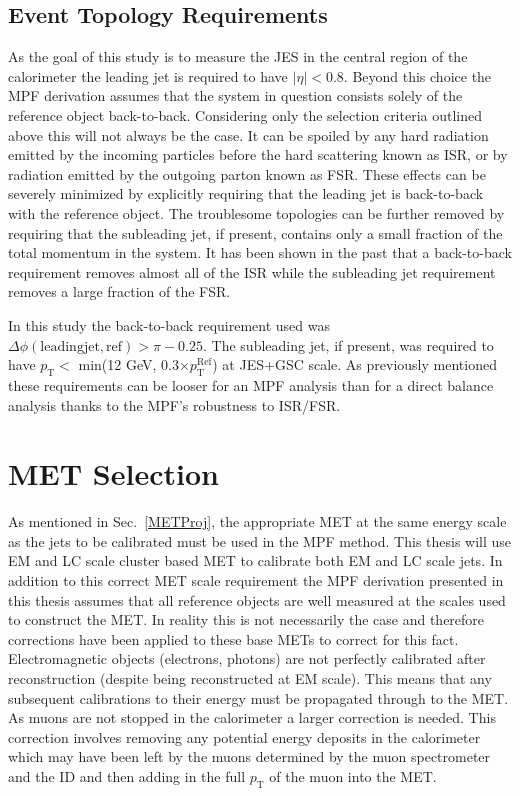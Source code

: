 
\subsection{Event Topology Requirements}
\label{Sec:EventTopology}
As the goal of this study is to measure the \gls{JES} in the central region of the calorimeter the leading jet is required to have $\mid\eta\mid<$0.8.  
Beyond this choice the MPF derivation assumes that the system in question consists solely of the reference object back-to-back.  
Considering only the selection criteria outlined above this will not always be the case.  
It can be spoiled by any hard radiation emitted by the incoming particles before the hard scattering known as \gls{ISR}, or by radiation emitted by the outgoing parton known as \gls{FSR}.  
These effects can be severely minimized by explicitly requiring that the leading jet is back-to-back with the reference object.  
The troublesome topologies can be further removed by requiring that the subleading jet, if present, contains only a small fraction of the total momentum in the system.  
It has been shown in the past that a back-to-back requirement removes almost all of the ISR while the subleading jet requirement removes a large fraction of the FSR.  

In this study the back-to-back requirement used was $\Delta \phi \left({\mathrm {leading jet, ref}}\right)>\pi-0.25$.  
The subleading jet, if present, was required to have $p_{\mathrm T}<$ min(12 GeV, 0.3$\times p_{\mathrm T}^{\mathrm {Ref}}$) at JES+GSC scale.  
As previously mentioned these requirements can be looser for an MPF analysis than for a direct balance analysis thanks to the MPF's robustness to ISR/FSR.  


\section{MET Selection}
As mentioned in Sec.~\ref{METProj}, the appropriate MET at the same energy scale as the jets to be calibrated must be used in the MPF method.  
This thesis will use EM and LC scale cluster based MET to calibrate both EM and LC scale jets.  
In addition to this correct MET scale requirement the MPF derivation presented in this thesis assumes that all reference objects are well measured at the scales used to construct the MET.  
In reality this is not necessarily the case and therefore corrections have been applied to these base METs to correct for this fact.  
Electromagnetic objects (electrons, photons) are not perfectly calibrated after reconstruction (despite being reconstructed at EM scale).  
This means that any subsequent calibrations to their energy must be propagated through to the MET.  
As muons are not stopped in the calorimeter a larger correction is needed.  
This correction involves removing any potential energy deposits in the calorimeter which may have been left by the muons determined by the muon spectrometer and the ID and then adding in the full $p_{\mathrm T}$ of the muon into the MET.  


